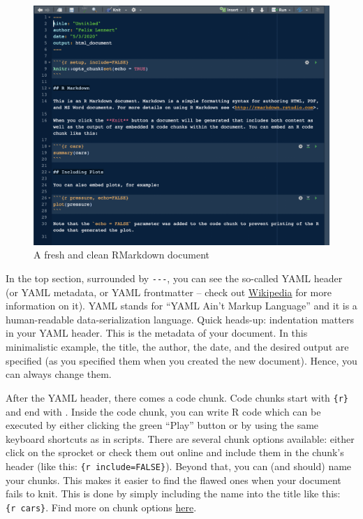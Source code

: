 \documentclass[
]{book}
\begin{document}
\begin{figure}
\centering
\includegraphics{figures/new_markdown_2.png}
\caption{A fresh and clean RMarkdown document}
\end{figure}

In the top section, surrounded by \texttt{-\/-\/-}, you can see the so-called YAML header (or YAML metadata, or YAML frontmatter -- check out \href{https://en.wikipedia.org/wiki/YAML}{Wikipedia} for more information on it). YAML stands for ``YAML Ain't Markup Language'' and it is a human-readable data-serialization language. Quick heads-up: indentation matters in your YAML header. This is the metadata of your document. In this minimalistic example, the title, the author, the date, and the desired output are specified (as you specified them when you created the new document). Hence, you can always change them.

After the YAML header, there comes a code chunk. Code chunks start with \texttt{\textasciigrave{}\textasciigrave{}\textasciigrave{}\{r\}} and end with \texttt{\textasciigrave{}\textasciigrave{}\textasciigrave{}}. Inside the code chunk, you can write R code which can be executed by either clicking the green ``Play'' button or by using the same keyboard shortcuts as in scripts. There are several chunk options available: either click on the sprocket or check them out online and include them in the chunk's header (like this: \texttt{\textasciigrave{}\textasciigrave{}\textasciigrave{}\{r\ include=FALSE\}}).
Beyond that, you can (and should) name your chunks. This makes it easier to find the flawed ones when your document fails to knit. This is done by simply including the name into the title like this: \texttt{\textasciigrave{}\textasciigrave{}\textasciigrave{}\{r\ cars\}}. Find more on chunk options \href{https://bookdown.org/yihui/rmarkdown/r-code.html}{here}.
\end{document}
